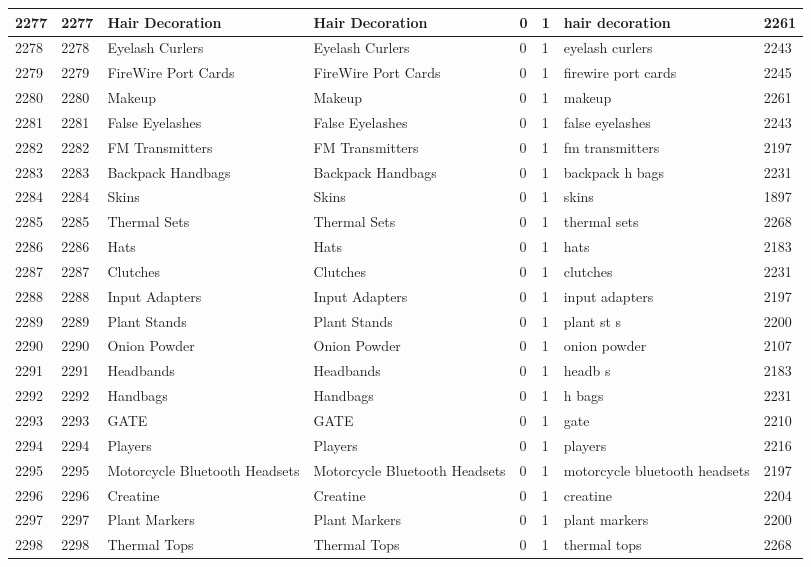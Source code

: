 \begin{longtable}{|l|l|l|l|l|l|l|l|}
2277 & 2277 & Hair Decoration & Hair Decoration & 0 & 1 & hair decoration & 2261 \\ \hline 
2278 & 2278 & Eyelash Curlers & Eyelash Curlers & 0 & 1 & eyelash curlers & 2243 \\ \hline 
2279 & 2279 & FireWire Port Cards & FireWire Port Cards & 0 & 1 & firewire port cards & 2245 \\ \hline 
2280 & 2280 & Makeup & Makeup & 0 & 1 & makeup & 2261 \\ \hline 
2281 & 2281 & False Eyelashes & False Eyelashes & 0 & 1 & false eyelashes & 2243 \\ \hline 
2282 & 2282 & FM Transmitters & FM Transmitters & 0 & 1 & fm transmitters & 2197 \\ \hline 
2283 & 2283 & Backpack Handbags & Backpack Handbags & 0 & 1 & backpack h bags & 2231 \\ \hline 
2284 & 2284 & Skins & Skins & 0 & 1 & skins & 1897 \\ \hline 
2285 & 2285 & Thermal Sets & Thermal Sets & 0 & 1 & thermal sets & 2268 \\ \hline 
2286 & 2286 & Hats & Hats & 0 & 1 & hats & 2183 \\ \hline 
2287 & 2287 & Clutches & Clutches & 0 & 1 & clutches & 2231 \\ \hline 
2288 & 2288 & Input Adapters & Input Adapters & 0 & 1 & input adapters & 2197 \\ \hline 
2289 & 2289 & Plant Stands & Plant Stands & 0 & 1 & plant st s & 2200 \\ \hline 
2290 & 2290 & Onion Powder & Onion Powder & 0 & 1 & onion powder & 2107 \\ \hline 
2291 & 2291 & Headbands & Headbands & 0 & 1 & headb s & 2183 \\ \hline 
2292 & 2292 & Handbags & Handbags & 0 & 1 & h bags & 2231 \\ \hline 
2293 & 2293 & GATE & GATE & 0 & 1 & gate & 2210 \\ \hline 
2294 & 2294 & Players & Players & 0 & 1 & players & 2216 \\ \hline 
2295 & 2295 & Motorcycle Bluetooth Headsets & Motorcycle Bluetooth Headsets & 0 & 1 & motorcycle bluetooth headsets & 2197 \\ \hline 
2296 & 2296 & Creatine & Creatine & 0 & 1 & creatine & 2204 \\ \hline 
2297 & 2297 & Plant Markers & Plant Markers & 0 & 1 & plant markers & 2200 \\ \hline 
2298 & 2298 & Thermal Tops & Thermal Tops & 0 & 1 & thermal tops & 2268 \\ \hline 

\end{longtable}
